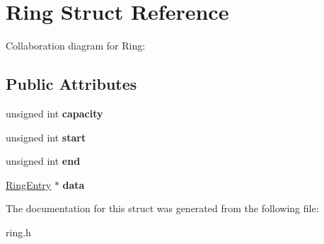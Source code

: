 \hypertarget{structRing}{}\section{Ring Struct Reference}
\label{structRing}


Collaboration diagram for Ring\+:
\subsection*{Public Attributes}
\begin{DoxyCompactItemize}
\item 
\mbox{\label{structRing_a49514c27dd8d8c6f850ac6cf86c3f8fc}} 
unsigned int {\bfseries capacity}
\item 
\mbox{\label{structRing_a05ded3e84726b36d0b2266e733ddc61e}} 
unsigned int {\bfseries start}
\item 
\mbox{\label{structRing_a704c118e618f3fac90554954b90ff363}} 
unsigned int {\bfseries end}
\item 
\mbox{\label{structRing_a610017b8cf1bff81f61e32bbf3cdf972}} 
\hyperlink{structRingEntry}{Ring\+Entry} $\ast$ {\bfseries data}
\end{DoxyCompactItemize}


The documentation for this struct was generated from the following file\+:\begin{DoxyCompactItemize}
\item 
ring.\+h\end{DoxyCompactItemize}
